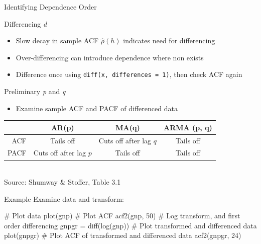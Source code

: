\documentclass[ignorenonframetext,xcolor=x11names]{beamer}
\begin{document}
\begin{frame}{Identifying Dependence Order}
\small
\begin{block}{Differencing \emph{d}}
\begin{itemize}
   \item Slow decay in sample ACF $\hat\rho(h)$ indicates need for differencing
   \item Over-differencing can introduce dependence where non exists
   \item Difference once using \texttt{diff(x, differences = 1)}, then check ACF again
\end{itemize}
\end{block}

\begin{block}{Preliminary \emph{p} and \emph{q}}
\begin{itemize}
   \item Examine sample ACF and PACF of differenced data %
\end{itemize}
\vspace{.5\baselineskip} 
\renewcommand{\arraystretch}{1.5}
\begin{tabular}{r|c|c|c} \hline
 & AR(p) & MA(q) & ARMA (p, q) \\ \hline
 ACF & Tails off & Cuts off after lag $q$ & Tails off \\
 PACF & Cuts off after lag $p$ & Tails off & Tails off \\ \hline
\end{tabular} \\
\vspace{.5\baselineskip}
\scriptsize Source: Shumway \& Stoffer, Table 3.1 \normalsize
\end{block}
\end{frame}

\begin{frame}[fragile]{Example}
Examine data and transform:
\begin{Rcode}
# Plot data
plot(gnp)
# Plot ACF
acf2(gnp, 50)
# Log transform, and first order differencing
gnpgr = diff(log(gnp))
# Plot transformed and differenced data
plot(gnpgr)
# Plot ACF of transformed and differenced data
acf2(gnpgr, 24)
\end{Rcode}
\end{frame}
\end{document}
